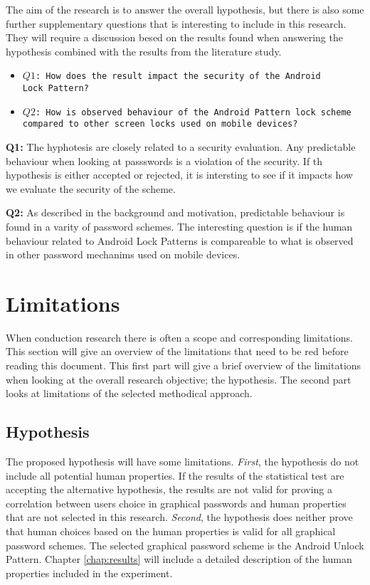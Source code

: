 		The aim of the research is to answer the overall hypothesis, but there is also some further supplementary questions that is interesting to include in this research. They will require a discussion besed on the results found when answering the hypothesis combined with the results from the literature study.

	  {\renewcommand\labelitemi{}
			\begin{itemize}
	  		\item \texttt{$Q1$: How does the result impact the security of the Android \\Lock Pattern?}
	  		\item \texttt{$Q2$: How is observed behaviour of the Android Pattern lock scheme \\compared to other screen locks used on mobile devices?}
	  	\end{itemize}
	  }

	  {\bf Q1:} The hyphotesis are closely related to a security evaluation. Any predictable behaviour when looking at passswords is a violation of the security. If th hypothesis is either accepted or rejected, it is intersting to see if it impacts how we evaluate the security of the scheme. 

	  {\bf Q2:} As described in the background and motivation, predictable behaviour is found in a varity of password schemes. The interesting question is if the human behaviour related to Android Lock Patterns is compareable to what is observed in other password mechanims used on mobile devices. 


	\section{Limitations}
		When conduction research there is often a scope and corresponding limitations. This section will give an overview of the limitations that need to be red before reading this document. This first part will give a brief overview of the limitations when looking at the overall research objective; the hypothesis. The second part looks at limitations of the selected methodical approach. 

		\subsection{Hypothesis}
	  	The proposed hypothesis will have some limitations. {\it First}, the hypothesis do not include all potential human properties. If the results of the statistical test are accepting the alternative hypothesis, the results are not valid for proving a correlation between users choice in graphical passwords and human properties that are not selected in this research. {\it Second}, the hypothesis does neither prove that human choices based on the human properties is valid for all graphical password schemes. The selected graphical password scheme is the Android Unlock Pattern. Chapter \ref{chap:results} will include a detailed description of the human properties included in the experiment.

